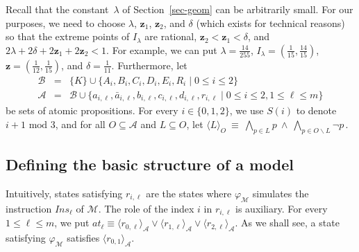 \documentclass[a4paper,UKenglish,cleveref, autoref, thm-restate]{lipics-v2021}
\newcommand{\A}{\mathcal{A}}
\newcommand{\B}{\mathcal{B}}
\newcommand{\M}{\mathcal{M}}
\newcommand{\ex}[1]{\langle #1 \rangle}
\newcommand{\Ins}{\mathit{Ins}}
\newcommand{\at}{\mathit{at}}
\renewcommand{\vec}[1]{\pmb{#1}}
\begin{document}
Recall that the constant~$\lambda$ of Section~\ref{sec-geom} can be arbitrarily small. For our purposes, we need to choose $\lambda$, $\vec{z}_1$, $\vec{z}_2$, and $\delta$ (which exists for technical reasons) so that the extreme points of $I_\lambda$ are rational, $\vec{z}_2 < \vec{z}_1 < \delta$, and
$2\lambda + 2\delta + 2\vec{z}_1 + 2\vec{z}_2 < 1$.
For example, we can put $\lambda = \frac{14}{255}$, $I_\lambda =(\frac{1}{15},\frac{14}{15})$, $\vec{z} = (\frac{1}{12},\frac{1}{15})$, and $\delta = \frac{1}{11}$.  Furthermore, let
\begin{eqnarray*}
    \B & = & \{K\} \cup \{A_i,B_i,C_i,D_i,E_i,R_i \mid 0 \leq i \leq 2\}\\
    \A & = & \B \cup  \{a_{i,\ell},\bar{a}_{i,\ell},b_{i,\ell},c_{i,\ell},d_{i,\ell},r_{i,\ell} \mid 0 \leq i \leq 2, 1 \leq \ell \leq m\}
\end{eqnarray*}
be sets of atomic propositions.
For every $i \in \{0,1,2\}$, we use $S(i)$ to denote $i{+}1 \mbox{ mod } 3$, and
for all $O \subseteq \A$ and $L \subseteq O$, let
\(
    \ex{L}_O \ \equiv \  \bigwedge_{p \in L} p  ~\wedge~ \bigwedge_{p \in O \smallsetminus L} \neg p\,.
\)

\subsection{Defining the basic structure of a model}
\label{sec-structure}
Intuitively, states satisfying $r_{i,\ell}$ are the states where $\varphi_\M$ simulates the instruction $\Ins_\ell$ of $\M$. The role of the index $i$ in $r_{i,\ell}$ is auxiliary. For every $1 \leq \ell \leq m$, we put $\at_\ell \equiv \ex{r_{0,\ell}}_\A \vee \ex{r_{1,\ell}}_\A \vee \ex{r_{2,\ell}}_\A$. As we shall see, a state satisfying $\varphi_\M$ satisfies $\ex{r_{0,1}}_{\A}$.
\end{document}
